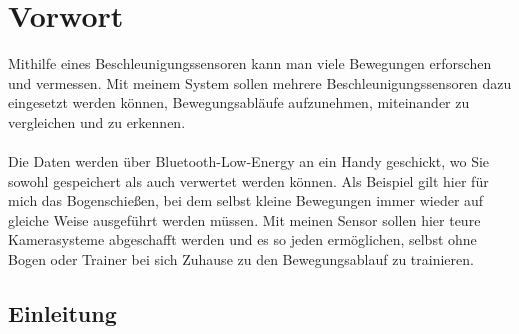 \chapter[Vorwort]{Vorwort}

Mithilfe eines Beschleunigungssensoren kann man viele 
Bewegungen erforschen und vermessen.
Mit meinem System sollen mehrere Beschleunigungssensoren 
dazu eingesetzt werden können, Bewegungsabläufe aufzunehmen, 
miteinander zu vergleichen und zu erkennen.\\
\\
Die Daten werden über Bluetooth-Low-Energy an ein Handy 
geschickt, wo Sie sowohl gespeichert als auch verwertet 
werden können. Als Beispiel gilt hier für mich das Bogenschießen, 
bei dem selbst kleine Bewegungen immer wieder auf gleiche Weise 
ausgeführt werden müssen. Mit meinen Sensor sollen hier teure 
Kamerasysteme abgeschafft werden und es so jeden ermöglichen, 
selbst ohne Bogen oder Trainer bei sich Zuhause zu den 
Bewegungsablauf zu trainieren.\\

\section{Einleitung}
